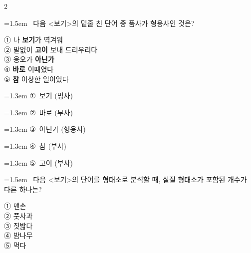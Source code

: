 \documentclass[10pt, a4paper]{article}
\begin{document}
\begin{multicols}{2}
\begin{minipage}{\columnwidth}
\vspace{4mm}
\end{minipage}
\par

\noindent\begin{minipage}{\columnwidth}
\vspace{2mm}
{\hangindent=1.5em  ~다음 <보기>의 밑줄 친 단어 중 품사가 형용사인 것은?\par}

\vspace{1mm}
\begin{boxibox}
① 나 \textbf{보기}가 역겨워 \\
② 말없이 \textbf{고이} 보내 드리우리다 \\
③ 응오가 \textbf{아닌가} \\
④ \textbf{바로} 이때였다 \\
⑤ \textbf{참} 이상한 일이었다 \\
\end{boxibox}
\vspace{1mm}

\vspace{0.5mm}
{\hangindent=1.3em  \noindent\hspace{0.3em}①~보기 (명사)\par}
{\hangindent=1.3em  \noindent\hspace{0.3em}②~바로 (부사)\par}
{\hangindent=1.3em  \noindent\hspace{0.3em}③~아닌가 (형용사)\par}
{\hangindent=1.3em  \noindent\hspace{0.3em}④~참 (부사)\par}
{\hangindent=1.3em  \noindent\hspace{0.3em}⑤~고이 (부사)\par}
\vspace{4mm}
\end{minipage}
\par

\noindent\begin{minipage}{\columnwidth}
\vspace{2mm}
{\hangindent=1.5em  ~다음 <보기>의 단어를 형태소로 분석할 때, 실질 형태소가 포함된 개수가 다른 하나는?\par}

\vspace{1mm}
\begin{boxibox}
① 맨손 \\
② 풋사과 \\
③ 짓밟다 \\
④ 밤나무 \\
⑤ 먹다 \\
\end{boxibox}
\vspace{1mm}


\end{minipage}
\end{multicols}
\end{document}
